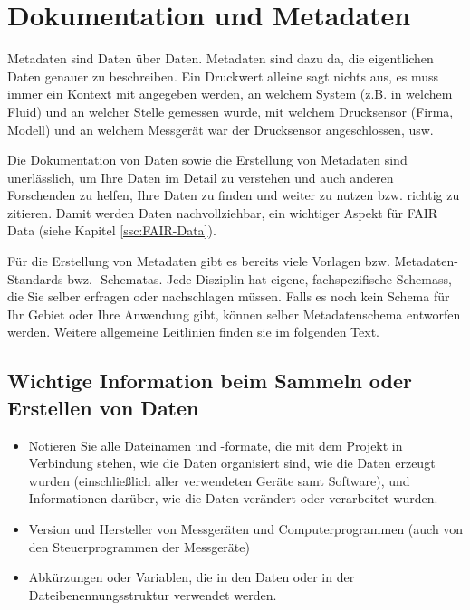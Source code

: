 \section{Dokumentation und Metadaten}\label{ssc:Doku+Metadata}

Metadaten sind Daten über Daten. Metadaten sind dazu da, die eigentlichen Daten genauer zu beschreiben. Ein Druckwert alleine sagt nichts aus, es muss immer ein Kontext mit angegeben werden, an welchem System (z.B. in welchem Fluid) und an welcher Stelle gemessen wurde, mit welchem Drucksensor (Firma, Modell) und an welchem Messgerät war der Drucksensor angeschlossen, usw.

Die Dokumentation von Daten sowie die Erstellung von Metadaten sind unerlässlich, um Ihre Daten im Detail zu verstehen und auch anderen Forschenden zu helfen, Ihre Daten zu finden und weiter zu nutzen bzw. richtig zu zitieren. Damit werden Daten nachvollziehbar, ein wichtiger Aspekt für FAIR Data (siehe Kapitel \ref{ssc:FAIR-Data}).

Für die Erstellung von Metadaten gibt es bereits viele Vorlagen bzw. Metadaten-Standards bwz. -Schematas. Jede Disziplin hat eigene, fachspezifische Schemass, die Sie selber erfragen oder nachschlagen müssen. Falls es noch kein Schema für Ihr Gebiet oder Ihre Anwendung gibt, können selber Metadatenschema entworfen werden. Weitere allgemeine Leitlinien finden sie im folgenden Text.


\subsection{Wichtige Information beim Sammeln oder Erstellen von Daten}

\begin{itemize}
  \item Notieren Sie alle Dateinamen und -formate, die mit dem Projekt in
        Verbindung stehen, wie die Daten organisiert sind, wie die Daten
        erzeugt wurden (einschließlich aller verwendeten Geräte samt Software),
        und Informationen darüber, wie die Daten verändert oder verarbeitet
        wurden.
  \item Version und Hersteller von Messgeräten und Computerprogrammen (auch von den Steuerprogrammen der Messgeräte)
  \item Abkürzungen oder Variablen, die in den Daten oder in der Dateibenennungsstruktur verwendet werden.
\end{itemize}



